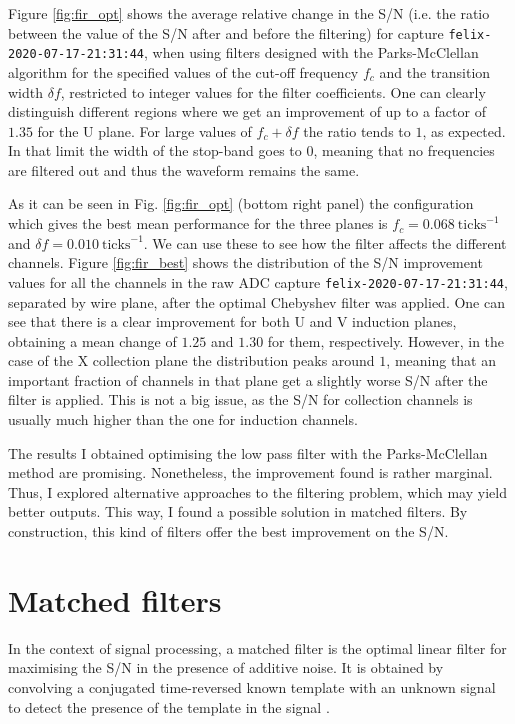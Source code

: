 Figure \ref{fig:fir_opt} shows the average relative change in the S/N (i.e. the ratio between the value of the S/N after and before the filtering) for capture \texttt{felix-2020-07-17-21:31:44}, when using filters designed with the Parks-McClellan algorithm for the specified values of the cut-off frequency $f_{c}$ and the transition width $\delta f$, restricted to integer values for the filter coefficients. One can clearly distinguish different regions where we get an improvement of up to a factor of $1.35$ for the U plane. For large values of $f_{c} + \delta f$ the ratio tends to $1$, as expected. In that limit the width of the stop-band goes to $0$, meaning that no frequencies are filtered out and thus the waveform remains the same.

As it can be seen in Fig. \ref{fig:fir_opt} (bottom right panel) the configuration which gives the best mean performance for the three planes is $f_{c} = 0.068 \ \mathrm{ticks}^{-1}$ and $\delta f = 0.010 \ \mathrm{ticks}^{-1}$. We can use these to see how the filter affects the different channels. Figure \ref{fig:fir_best} shows the distribution of the S/N improvement values for all the channels in the raw ADC capture \texttt{felix-2020-07-17-21:31:44}, separated by wire plane, after the optimal Chebyshev filter was applied. One can see that there is a clear improvement for both U and V induction planes, obtaining a mean change of $1.25$ and $1.30$ for them, respectively. However, in the case of the X collection plane the distribution peaks around $1$, meaning that an important fraction of channels in that plane get a slightly worse S/N after the filter is applied. This is not a big issue, as the S/N for collection channels is usually much higher than the one for induction channels.

The results I obtained optimising the low pass filter with the Parks-McClellan method are promising. Nonetheless, the improvement found is rather marginal. Thus, I explored alternative approaches to the filtering problem, which may yield better outputs. This way, I found a possible solution in matched filters. By construction, this kind of filters offer the best improvement on the S/N.

\section{Matched filters}
\label{sec:matched_filter_matched_filter}

In the context of signal processing, a matched filter is the optimal linear filter for maximising the S/N in the presence of additive noise. It is obtained by convolving a conjugated time-reversed known template with an unknown signal to detect the presence of the template in the signal \cite{Turin1960}.

